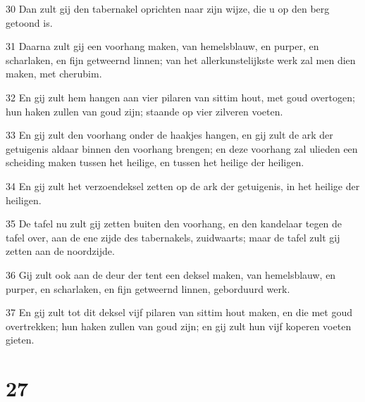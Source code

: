 \par 30 Dan zult gij den tabernakel oprichten naar zijn wijze, die u op den berg getoond is.
\par 31 Daarna zult gij een voorhang maken, van hemelsblauw, en purper, en scharlaken, en fijn getweernd linnen; van het allerkunstelijkste werk zal men dien maken, met cherubim.
\par 32 En gij zult hem hangen aan vier pilaren van sittim hout, met goud overtogen; hun haken zullen van goud zijn; staande op vier zilveren voeten.
\par 33 En gij zult den voorhang onder de haakjes hangen, en gij zult de ark der getuigenis aldaar binnen den voorhang brengen; en deze voorhang zal ulieden een scheiding maken tussen het heilige, en tussen het heilige der heiligen.
\par 34 En gij zult het verzoendeksel zetten op de ark der getuigenis, in het heilige der heiligen.
\par 35 De tafel nu zult gij zetten buiten den voorhang, en den kandelaar tegen de tafel over, aan de ene zijde des tabernakels, zuidwaarts; maar de tafel zult gij zetten aan de noordzijde.
\par 36 Gij zult ook aan de deur der tent een deksel maken, van hemelsblauw, en purper, en scharlaken, en fijn getweernd linnen, geborduurd werk.
\par 37 En gij zult tot dit deksel vijf pilaren van sittim hout maken, en die met goud overtrekken; hun haken zullen van goud zijn; en gij zult hun vijf koperen voeten gieten.

\chapter{27}

